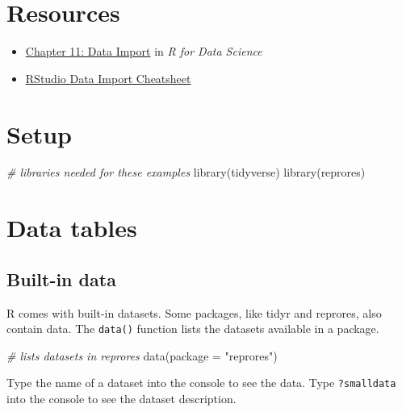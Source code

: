 \documentclass[
  oneside]{book}
\newenvironment{Shaded}{\begin{snugshade}}{\end{snugshade}}
\newcommand{\AttributeTok}[1]{\textcolor[rgb]{0.77,0.63,0.00}{#1}}
\newcommand{\CommentTok}[1]{\textcolor[rgb]{0.56,0.35,0.01}{\textit{#1}}}
\newcommand{\FunctionTok}[1]{\textcolor[rgb]{0.00,0.00,0.00}{#1}}
\newcommand{\NormalTok}[1]{#1}
\newcommand{\StringTok}[1]{\textcolor[rgb]{0.31,0.60,0.02}{#1}}
\providecommand{\tightlist}{%
  \setlength{\itemsep}{0pt}\setlength{\parskip}{0pt}}
\begin{document}
\hypertarget{resources2}{%
\section{Resources}\label{resources2}}

\begin{itemize}
\tightlist
\item
  \href{http://r4ds.had.co.nz/data-import.html}{Chapter 11: Data Import} in \emph{R for Data Science}
\item
  \href{https://github.com/rstudio/cheatsheets/raw/master/data-import.pdf}{RStudio Data Import Cheatsheet}
\end{itemize}

\hypertarget{setup2}{%
\section{Setup}\label{setup2}}

\begin{Shaded}
\begin{Highlighting}[]
\CommentTok{\# libraries needed for these examples}
\FunctionTok{library}\NormalTok{(tidyverse)}
\FunctionTok{library}\NormalTok{(reprores)}
\end{Highlighting}
\end{Shaded}

\hypertarget{data-tables}{%
\section{Data tables}\label{data-tables}}

\hypertarget{builtin}{%
\subsection{Built-in data}\label{builtin}}

R comes with built-in datasets. Some packages, like tidyr and reprores, also contain data. The \texttt{data()} function lists the datasets available in a package.

\begin{Shaded}
\begin{Highlighting}[]
\CommentTok{\# lists datasets in reprores}
\FunctionTok{data}\NormalTok{(}\AttributeTok{package =} \StringTok{"reprores"}\NormalTok{)}
\end{Highlighting}
\end{Shaded}

Type the name of a dataset into the console to see the data. Type \texttt{?smalldata} into the console to see the dataset description.
\end{document}
